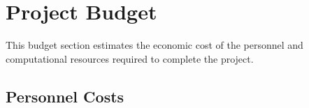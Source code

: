 \begin{table}[htbp]
    \centering
    \caption{Initial temporal planning of the project.}
    \label{tab:initial_temporal_planning}
    \scriptsize
\end{table}

\section{Project Budget}
\label{sec:project_budget}

This budget section estimates the economic cost of the personnel and computational resources required to complete the project.

\subsection{Personnel Costs}
\label{subsec:personnel_costs}

